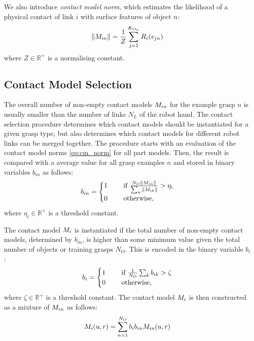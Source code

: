 We also introduce \textit{contact model norm}, which estimates the likelihood of a physical contact of link $i$ with surface features of object $n$:
\begin{equation}\label{eq:cm_norm}
\|M_{in}\| = \frac 1Z \sum_{j=1}^{K_{O_n}} R_{i}(v_{jn})
\end{equation}
where $Z \in \mathbb R^+$ is a normalising constant.

\subsection{Contact Model Selection}

The overall number of non-empty contact models $M_{in}$ for the example grasp $n$ is usually smaller than the number of links $N_L$ of the robot hand. The contact selection procedure determines which contact models should be instantiated for a given grasp type, but also determines which contact models for different robot links can be merged together. The procedure starts with an evaluation of the contact model norms \eqref{eq:cm_norm} for all part models. Then, the result is compared with a average value for all grasp examples $n$ and stored in binary variables $b_{in}$ as follows:
\begin{equation}
b_{in} = \begin{cases} 1 \quad &\textnormal{ if } \frac{N_O \|M_{in}\|}{\sum_k\|M_{ik}\|} > \eta_i \\
0 \quad &\textnormal{ otherwise},\end{cases}
\label{eq:cm_n_binary}
\end{equation}
where $\eta_i \in \mathbb{R}^+$ is a threshold constant.

The contact model $M_i$ is instantiated if the total number of non-empty contact models, determined by $b_{in}$, is higher than some minimum value given the total number of objects or training grasps $N_O$. This is encoded in the binary variable $b_i$:
\begin{equation}
b_i = \begin{cases} 1 \quad &\textnormal{ if } \frac{1}{N_O} \sum_k b_{ik} > \zeta\\
0 \quad &\textnormal{ otherwise},\end{cases}
\label{eq:cm_binary}
\end{equation}
where $\zeta \in \mathbb{R}^+$ is a threshold constant. The contact model $M_i$ is then constructed as a mixture of $M_{in}$ as follows:
\begin{equation}\label{eq:cm}
M_{i}(u, r) = \sum_{n=1}^{N_O} b_{i} b_{in} M_{in}(u, r)
\end{equation}


